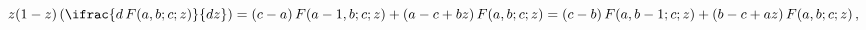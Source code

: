 \[z(1-z)\left(\ifrac{d\mathop{F\/}\nolimits\!\left(a,b;c;z\right)}{dz}\right)=(c%
-a)\mathop{F\/}\nolimits\!\left(a-1,b;c;z\right)+(a-c+bz)\mathop{F\/}\nolimits%
\!\left(a,b;c;z\right)=(c-b)\mathop{F\/}\nolimits\!\left(a,b-1;c;z\right)+(b-c%
+az)\mathop{F\/}\nolimits\!\left(a,b;c;z\right),\]